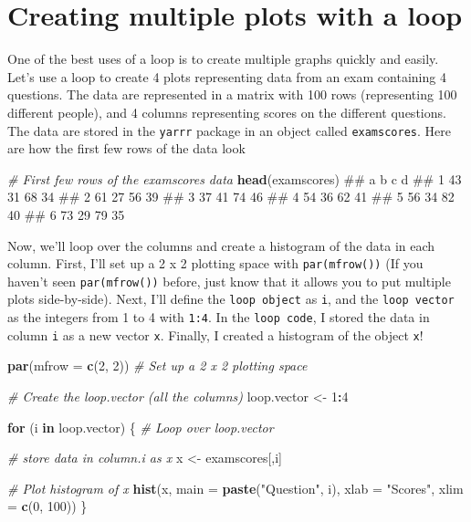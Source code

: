 \documentclass[]{book}
\newenvironment{Shaded}{\begin{snugshade}}{\end{snugshade}}
\newcommand{\KeywordTok}[1]{\textcolor[rgb]{0.13,0.29,0.53}{\textbf{#1}}}
\newcommand{\DataTypeTok}[1]{\textcolor[rgb]{0.13,0.29,0.53}{#1}}
\newcommand{\DecValTok}[1]{\textcolor[rgb]{0.00,0.00,0.81}{#1}}
\newcommand{\StringTok}[1]{\textcolor[rgb]{0.31,0.60,0.02}{#1}}
\newcommand{\CommentTok}[1]{\textcolor[rgb]{0.56,0.35,0.01}{\textit{#1}}}
\newcommand{\ControlFlowTok}[1]{\textcolor[rgb]{0.13,0.29,0.53}{\textbf{#1}}}
\newcommand{\OperatorTok}[1]{\textcolor[rgb]{0.81,0.36,0.00}{\textbf{#1}}}
\newcommand{\NormalTok}[1]{#1}
\theoremstyle{definition}
\theoremstyle{definition}
\theoremstyle{remark}
\begin{document}
\section{Creating multiple plots with a
loop}\label{creating-multiple-plots-with-a-loop}

One of the best uses of a loop is to create multiple graphs quickly and
easily. Let's use a loop to create 4 plots representing data from an
exam containing 4 questions. The data are represented in a matrix with
100 rows (representing 100 different people), and 4 columns representing
scores on the different questions. The data are stored in the
\texttt{yarrr} package in an object called \texttt{examscores}. Here are
how the first few rows of the data look

\begin{Shaded}
\begin{Highlighting}[]
\CommentTok{# First few rows of the examscores data}
\KeywordTok{head}\NormalTok{(examscores)}
\NormalTok{##    a  b  c  d}
\NormalTok{## 1 43 31 68 34}
\NormalTok{## 2 61 27 56 39}
\NormalTok{## 3 37 41 74 46}
\NormalTok{## 4 54 36 62 41}
\NormalTok{## 5 56 34 82 40}
\NormalTok{## 6 73 29 79 35}
\end{Highlighting}
\end{Shaded}

Now, we'll loop over the columns and create a histogram of the data in
each column. First, I'll set up a 2 x 2 plotting space with
\texttt{par(mfrow())} (If you haven't seen \texttt{par(mfrow())} before,
just know that it allows you to put multiple plots side-by-side). Next,
I'll define the \texttt{loop\ object} as \texttt{i}, and the
\texttt{loop\ vector} as the integers from 1 to 4 with \texttt{1:4}. In
the \texttt{loop\ code}, I stored the data in column \texttt{i} as a new
vector \texttt{x}. Finally, I created a histogram of the object
\texttt{x}!

\begin{Shaded}
\begin{Highlighting}[]
\KeywordTok{par}\NormalTok{(}\DataTypeTok{mfrow =} \KeywordTok{c}\NormalTok{(}\DecValTok{2}\NormalTok{, }\DecValTok{2}\NormalTok{))  }\CommentTok{# Set up a 2 x 2 plotting space}

\CommentTok{# Create the loop.vector (all the columns)}
\NormalTok{loop.vector <-}\StringTok{ }\DecValTok{1}\OperatorTok{:}\DecValTok{4}

\ControlFlowTok{for}\NormalTok{ (i }\ControlFlowTok{in}\NormalTok{ loop.vector) \{ }\CommentTok{# Loop over loop.vector}

  \CommentTok{# store data in column.i as x}
\NormalTok{  x <-}\StringTok{ }\NormalTok{examscores[,i]}
  
  \CommentTok{# Plot histogram of x}
  \KeywordTok{hist}\NormalTok{(x,}
       \DataTypeTok{main =} \KeywordTok{paste}\NormalTok{(}\StringTok{"Question"}\NormalTok{, i),}
       \DataTypeTok{xlab =} \StringTok{"Scores"}\NormalTok{,}
       \DataTypeTok{xlim =} \KeywordTok{c}\NormalTok{(}\DecValTok{0}\NormalTok{, }\DecValTok{100}\NormalTok{))}
\NormalTok{\}}
\end{Highlighting}
\end{Shaded}
\end{document}
